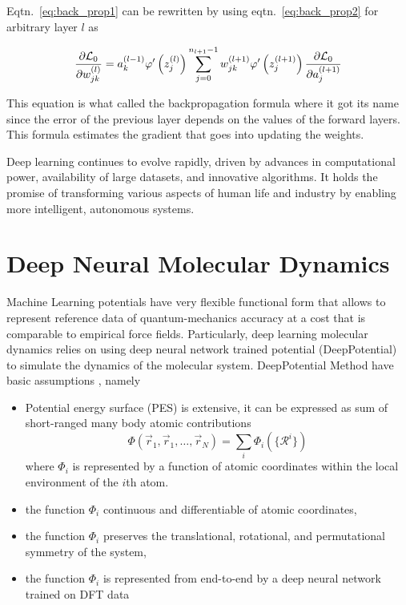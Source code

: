 Eqtn.~\eqref{eq:back_prop1} can be rewritten by using
eqtn.~\eqref{eq:back_prop2} for arbitrary layer $l$ as

\begin{equation}
    \pdv{\mathcal{L}_0}{w^{(l)}_{jk}} =  a^{(l-1)}_k \varphi'\left( z^{(l)}_j
    \right) \sum_{j=0}^{n_{l+1}-1}
    w^{(l+1)}_{jk} \varphi'
    \left( z^{(l+1)}_j \right)	 \pdv{\mathcal{L}_0}{a^{(l+1)}_j}
\end{equation}

This equation is what called the backpropagation formula where it got its name
since the error
of the
previous layer depends on the values of the forward layers. This formula
estimates the gradient that goes into updating the weights.

Deep learning continues to evolve rapidly, driven by advances in
computational power, availability of large datasets, and innovative algorithms.
It holds the promise of transforming various aspects of human life and industry
by enabling more intelligent, autonomous systems.

\section{Deep Neural Molecular Dynamics}
Machine Learning potentials have very flexible functional form that allows to
represent reference data of quantum-mechanics accuracy at a cost that is
comparable to empirical force fields. Particularly, deep learning molecular
dynamics relies on using deep neural network trained potential (DeepPotential)
to simulate the
dynamics of the molecular system.  DeepPotential Method have basic assumptions
\cite{zhang2018deep,zhang2018end},
namely

\begin{itemize}

    \item  Potential energy surface (PES) is extensive, it can be expressed as
          sum		of	     short-ranged many body atomic
          contributions
          \begin{equation}
              \Phi(\vec{r}_1,\vec{r}_1,\hdots, \vec{r}_N) = \sum_i
              \Phi_i(\{\mathcal{R}^i\})
          \end{equation}
          where $\Phi_i$ is represented by	     a		 function
          of atomic coordinates within the local environment of      the
          $i$th atom.
    \item  the function $\Phi_i$ continuous and differentiable
          of atomic coordinates,
    \item the function $\Phi_i$ preserves the translational, rotational,
          and
          permutational symmetry of the system,
    \item the function $\Phi_i$ is represented from end-to-end by a deep
          neural network trained on DFT data
\end{itemize}

